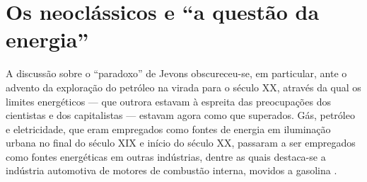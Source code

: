 




\section{Os neoclássicos e ``a questão da energia''}
A discussão sobre o ``paradoxo'' de Jevons obscureceu-se, em particular, ante o advento da exploração do petróleo na virada para o século XX, através da qual os limites energéticos --- que outrora estavam à espreita das preocupações dos cientistas e dos capitalistas --- estavam agora como que superados. Gás, petróleo e eletricidade, que eram empregados como fontes de energia em iluminação urbana no final do século XIX e início do século XX, passaram a ser empregados como fontes energéticas em outras indústrias, dentre as quais destaca-se a indústria automotiva de motores de combustão interna, movidos a gasolina \parencite[p. 8-9]{Fouquet2009}. 

